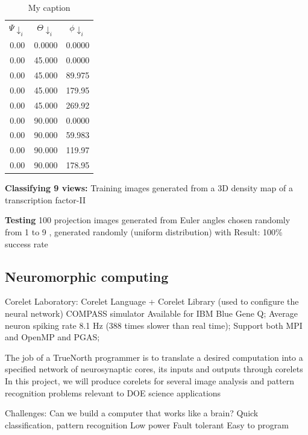 \begin{table}[]
\centering
\caption{My caption}
\label{my-label}
\begin{tabular}{|c|c|c|}
 $\Psi\downarrow_i$    & $\Theta\downarrow_i$       & $\phi\downarrow_i$       \\
0.00 & 0.0000 & 0.0000 \\
0.00 & 45.000 & 0.0000 \\
0.00 & 45.000 & 89.975 \\
0.00 & 45.000 & 179.95 \\
0.00 & 45.000 & 269.92 \\
0.00 & 90.000 & 0.0000 \\
0.00 & 90.000 & 59.983 \\
0.00 & 90.000 & 119.97 \\
0.00 & 90.000 & 178.95
\end{tabular}
\end{table}

\textbf{Classifying 9 views:}
Training images generated from a 3D density map of a transcription factor-II

\textbf{Testing}
100 projection images generated from Euler angles
 chosen randomly from 1 to 9
,  generated randomly (uniform distribution) with
Result: 100\% success rate


\subsection{Neuromorphic computing}
Corelet Laboratory: Corelet Language + Corelet Library (used to configure the neural network)
COMPASS simulator
Available for IBM Blue Gene Q;
Average neuron spiking rate 8.1 Hz (388 times slower than real time);
Support both MPI and OpenMP and PGAS;

The job of a TrueNorth programmer is to translate a desired computation into a specified network of neurosynaptic cores, its inputs and outputs through corelets
In this project, we will produce corelets for several image analysis and pattern recognition problems relevant to DOE science applications

Challenges: Can we build a computer that works like a brain?
Quick classification, pattern recognition
Low power
Fault tolerant
Easy to program



